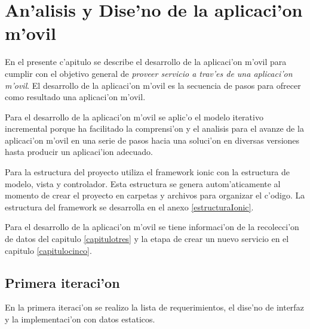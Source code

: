 \chapter{An'alisis y Dise'no de la aplicaci'on m'ovil}
\label{capituloseis}
En el presente c'apitulo se describe el desarrollo de la aplicaci'on m'ovil para cumplir con el objetivo general de \textit{proveer servicio a trav'es de una aplicaci'on m'ovil}. 
El desarrollo de la aplicaci'on m'ovil es la secuencia de pasos para ofrecer como resultado una aplicaci'on m'ovil.

Para el desarrollo de la aplicaci'on m'ovil se aplic'o el modelo iterativo incremental porque ha facilitado la comprensi'on y el analisis para el avanze de la aplicaci'on m'ovil en una serie de pasos hacia una soluci'on en diversas versiones hasta producir un aplicaci'ion adecuado\cite{Somerville2011}.

Para la estructura del proyecto utiliza el framework ionic con la  estructura de modelo, vista y controlador. Esta estructura se genera autom'aticamente al momento de crear el proyecto en carpetas y archivos para organizar el c'odigo. La estructura del framework se desarrolla en el anexo \ref{estructuraIonic}.


Para el desarrollo de la aplicaci'on m'ovil se tiene informaci'on de la recolecci'on de datos del capitulo \ref{capitulotres} y la etapa de crear un nuevo servicio en el capitulo \ref{capitulocinco}.

\section{Primera iteraci'on}
En la primera iteraci'on se realizo la lista de requerimientos, el dise'no de interfaz  y la implementaci'on con datos estaticos.

